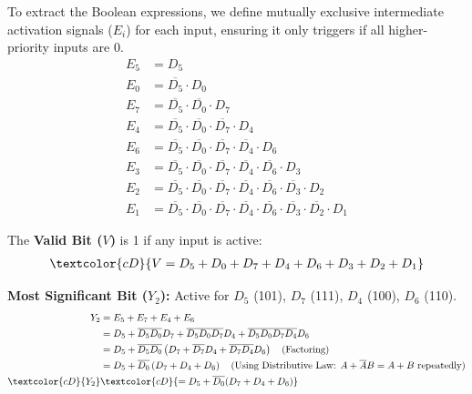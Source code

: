 \documentclass[12pt,a3paper]{article}
\begin{document}
\begin{enumerate}
\begin{tcolorbox}[enhanced,breakable,ansbox,colback=cD!4,colframe=cD,boxrule=0.8pt,arc=5pt,title={\textbf{Answer}},fonttitle=\bfseries\color{white},colbacktitle=cD]
To extract the Boolean expressions, we define mutually exclusive intermediate activation signals ($E_i$) for each input, ensuring it only triggers if all higher-priority inputs are 0.
\begin{align*}
    E_5 &= D_5 \\
    E_0 &= \overline{D_5} \cdot D_0 \\
    E_7 &= \overline{D_5} \cdot \overline{D_0} \cdot D_7 \\
    E_4 &= \overline{D_5} \cdot \overline{D_0} \cdot \overline{D_7} \cdot D_4 \\
    E_6 &= \overline{D_5} \cdot \overline{D_0} \cdot \overline{D_7} \cdot \overline{D_4} \cdot D_6 \\
    E_3 &= \overline{D_5} \cdot \overline{D_0} \cdot \overline{D_7} \cdot \overline{D_4} \cdot \overline{D_6} \cdot D_3 \\
    E_2 &= \overline{D_5} \cdot \overline{D_0} \cdot \overline{D_7} \cdot \overline{D_4} \cdot \overline{D_6} \cdot \overline{D_3} \cdot D_2 \\
    E_1 &= \overline{D_5} \cdot \overline{D_0} \cdot \overline{D_7} \cdot \overline{D_4} \cdot \overline{D_6} \cdot \overline{D_3} \cdot \overline{D_2} \cdot D_1
\end{align*}

The \textbf{Valid Bit ($V$)} is 1 if any input is active:
\begin{align*}
    \textcolor{cD}{V = D_5 + D_0 + D_7 + D_4 + D_6 + D_3 + D_2 + D_1}
\end{align*}

\textbf{Most Significant Bit ($Y_2$):} Active for $D_5$ (101), $D_7$ (111), $D_4$ (100), $D_6$ (110).
\begin{align*}
    Y_2 &= E_5 + E_7 + E_4 + E_6 \\
    &= D_5 + \overline{D_5}\overline{D_0}D_7 + \overline{D_5}\overline{D_0}\overline{D_7}D_4 + \overline{D_5}\overline{D_0}\overline{D_7}\overline{D_4}D_6 \\
    &= D_5 + \overline{D_5}\overline{D_0} \left( D_7 + \overline{D_7}D_4 + \overline{D_7}\overline{D_4}D_6 \right) \quad \text{(Factoring)} \\
    &= D_5 + \overline{D_0} \left( D_7 + D_4 + D_6 \right) \quad \text{(Using Distributive Law: $A + \overline{A}B = A + B$ repeatedly)} \\
    \textcolor{cD}{Y_2} &\textcolor{cD}{= D_5 + \overline{D_0} (D_7 + D_4 + D_6)}
\end{align*}


\end{tcolorbox}
\end{enumerate}
\end{document}
